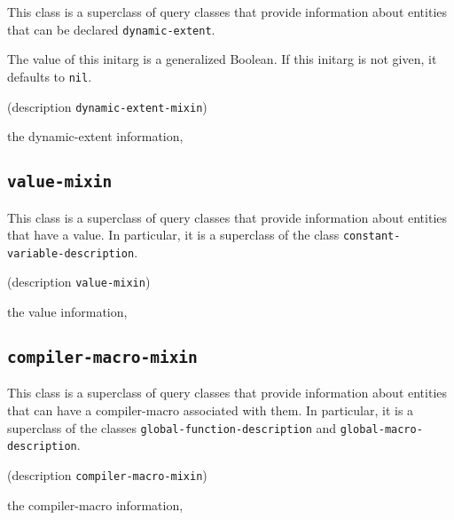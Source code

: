 {\footnotesize
{}
}

This class is a superclass of query classes that provide information
about entities that can be declared \texttt{dynamic-extent}.

{\footnotesize
{}
}

The value of this initarg is a generalized Boolean.  If this initarg
is not given, it defaults to \texttt{nil}.

{\footnotesize
{} {(description {\tt dynamic-extent-mixin})}
}

 the dynamic-extent information, 

\subsection{\texttt{value-mixin}}
\label{sec-value-mixin}

{\footnotesize
{}
}

This class is a superclass of query classes that provide information
about entities that have a value.  In particular, it is a superclass
of the class \texttt{constant-variable-description}.

{\footnotesize
{}
}

{\footnotesize
{} {(description {\tt value-mixin})}
}

 the value information, 

\subsection{\texttt{compiler-macro-mixin}}
\label{sec-compiler-macro-mixin}

{\footnotesize
{}
}

This class is a superclass of query classes that provide information
about entities that can have a compiler-macro associated with them.
In particular, it is a superclass of the classes
\texttt{global-function-description} and
\texttt{global-macro-description}.

{\footnotesize
{}
}

{\footnotesize
{} {(description {\tt compiler-macro-mixin})}
}

 the compiler-macro information, 

